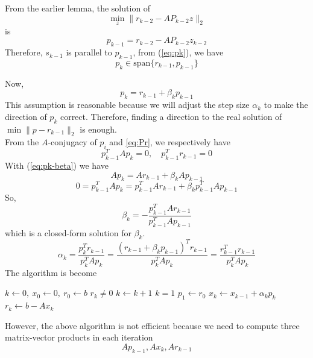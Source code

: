 From the earlier lemma, the solution of \[
    \min_{z} \|r_{k-2} - A P_{k-2} z\|_2
\]
is \[
    p_{k-1} = r_{k-2} - A P_{k-2} z_{k-2}
\]
Therefore, $s_{k-1}$ is parallel to $p_{k-1}$, from (\ref{eq:pk}), we have \[
    p_k \in \mbox{span}\{r_{k-1}, p_{k-1}\}
\]

Now,  \begin{equation}
    p_k = r_{k-1} + \beta_{k} p_{k-1} \label{eq:pk-beta}
\end{equation}
This assumption is reasonable because we will adjust the step size $\alpha_k$ to make the direction of $p_k$ correct. Therefore, finding a  direction to the real solution of $\min \|p-r_{k-1}\|_2$ is enough. \\

From the $A$-conjugacy of $p_i$ and \ref{eq:Pr}, we respectively have \[
    p_{k-1}^T A p_{k} = 0,\quad p_{k-1}^T r_{k-1} = 0
\]
With (\ref{eq:pk-beta}) we have \[
    Ap_k = A r_{k-1} + \beta_{k} A p_{k-1}
\]
\[
    0 = p_{k-1}^T A p_k = p_{k-1}^T A r_{k-1} + \beta_{k} p_{k-1}^T A p_{k-1}
\]
So, \[
    \beta_{k} = - \frac{p_{k-1}^T A r_{k-1}}{p_{k-1}^T A p_{k-1}}
\]
which is a closed-form solution for $\beta_{k}$.
\[
    \alpha_k = \frac{p_k^T r_{k-1}}{p_k^T A p_k} = \frac{(r_{k-1} + \beta_k p_{k-1})^T r_{k-1}}{p_k^T A p_k} = \frac{r_{k-1}^T r_{k-1}}{p_k^T A p_k}
\]
The algorithm is become
\begin{codebox}
\li $k \gets 0,\ x_0 \gets 0,\ r_0 \gets b$
\li \While $r_k \neq 0$ \Do
\li     $k \gets k + 1$
\li     \If $k = 1$ \Then
\li         $p_1 \gets r_0$
\li     \Else
\li         {}
\li         {}
\End
\li     {}
\li     $x_k \gets x_{k-1} + \alpha_k p_k$
\li     $r_k \gets b - A x_k$
\End
\end{codebox}

However, the above algorithm is not efficient because we need to compute three matrix-vector products in each iteration \[
    A p_{k-1}, A x_k, A r_{k-1}
\]